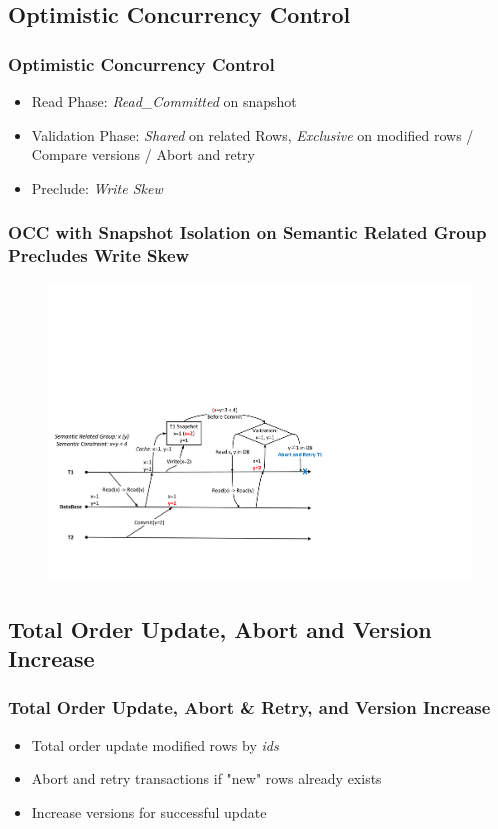 \documentclass{beamer}
\begin{document}
\subsection{Optimistic Concurrency Control}
\begin{frame}
	\frametitle{Optimistic Concurrency Control}
	\begin{itemize}
		\item Read Phase: \textit{Read\_Committed} on snapshot
		\item Validation Phase: \textit{Shared} on related Rows, \textit{Exclusive} on modified rows / Compare versions / Abort and retry
		\item Preclude: \textit{Write Skew}
	\end{itemize}
\end{frame}
\begin{frame}
	\frametitle{OCC with Snapshot Isolation on Semantic Related Group Precludes Write Skew}
	\begin{figure}[h]
		\centering
		\includegraphics[width=\linewidth]{figs/snapwriteskew.pdf}
	\end{figure}
\end{frame}

\subsection{Total Order Update, Abort and Version Increase}
\begin{frame}
	\frametitle{Total Order Update, Abort \& Retry, and Version Increase}
	\begin{itemize}
		\item Total order update modified rows by \textit{ids}
		\item Abort and retry transactions if "new" rows already exists
		\item Increase versions for successful update
	\end{itemize}
\end{frame}
\end{document}

